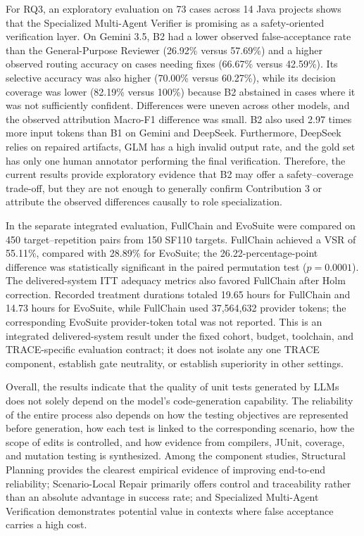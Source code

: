 \documentclass[pdflatex,sn-basic,Numbered,iicol]{sn-jnl}
\begin{document}
For RQ3, an exploratory evaluation on 73 cases across 14 Java projects shows that the Specialized Multi-Agent Verifier is promising as a safety-oriented verification layer. On Gemini 3.5, B2 had a lower observed false-acceptance rate than the General-Purpose Reviewer (26.92\% versus 57.69\%) and a higher observed routing accuracy on cases needing fixes (66.67\% versus 42.59\%). Its selective accuracy was also higher (70.00\% versus 60.27\%), while its decision coverage was lower (82.19\% versus 100\%) because B2 abstained in cases where it was not sufficiently confident. Differences were uneven across other models, and the observed attribution Macro-F1 difference was small. B2 also used 2.97 times more input tokens than B1 on Gemini and DeepSeek. Furthermore, DeepSeek relies on repaired artifacts, GLM has a high invalid output rate, and the gold set has only one human annotator performing the final verification. Therefore, the current results provide exploratory evidence that B2 may offer a safety--coverage trade-off, but they are not enough to generally confirm Contribution 3 or attribute the observed differences causally to role specialization.

In the separate integrated evaluation, FullChain and EvoSuite were compared on 450 target--repetition pairs from 150 SF110 targets. FullChain achieved a VSR of 55.11\%, compared with 28.89\% for EvoSuite; the 26.22-percentage-point difference was statistically significant in the paired permutation test ($p=0.0001$). The delivered-system ITT adequacy metrics also favored FullChain after Holm correction. Recorded treatment durations totaled 19.65 hours for FullChain and 14.73 hours for EvoSuite, while FullChain used 37,564,632 provider tokens; the corresponding EvoSuite provider-token total was not reported. This is an integrated delivered-system result under the fixed cohort, budget, toolchain, and TRACE-specific evaluation contract; it does not isolate any one TRACE component, establish gate neutrality, or establish superiority in other settings.

Overall, the results indicate that the quality of unit tests generated by LLMs does not solely depend on the model's code-generation capability. The reliability of the entire process also depends on how the testing objectives are represented before generation, how each test is linked to the corresponding scenario, how the scope of edits is controlled, and how evidence from compilers, JUnit, coverage, and mutation testing is synthesized. Among the component studies, Structural Planning provides the clearest empirical evidence of improving end-to-end reliability; Scenario-Local Repair primarily offers control and traceability rather than an absolute advantage in success rate; and Specialized Multi-Agent Verification demonstrates potential value in contexts where false acceptance carries a high cost.
\end{document}
